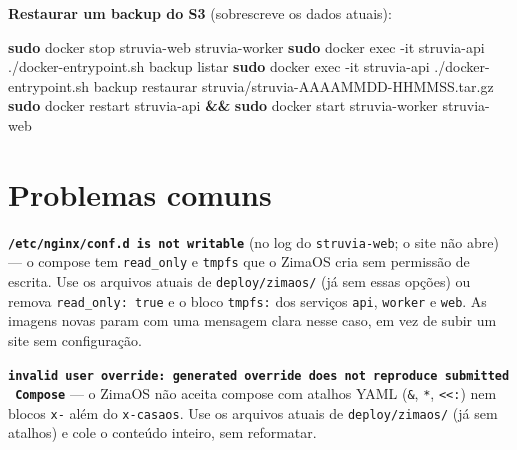 \documentclass[
  10pt,
]{article}
\newenvironment{Shaded}{\begin{snugshade}}{\end{snugshade}}
\newcommand{\AttributeTok}[1]{\textcolor[rgb]{0.13,0.29,0.53}{#1}}
\newcommand{\FunctionTok}[1]{\textcolor[rgb]{0.13,0.29,0.53}{\textbf{#1}}}
\newcommand{\KeywordTok}[1]{\textcolor[rgb]{0.13,0.29,0.53}{\textbf{#1}}}
\newcommand{\NormalTok}[1]{#1}
\newcommand{\OperatorTok}[1]{\textcolor[rgb]{0.81,0.36,0.00}{\textbf{#1}}}
\newcommand{\VariableTok}[1]{\textcolor[rgb]{0.00,0.00,0.00}{#1}}
\begin{document}
\begin{Shaded}
\end{Shaded}

\textbf{Restaurar um backup do S3} (sobrescreve os dados atuais):

\begin{Shaded}
\begin{Highlighting}[]
\FunctionTok{sudo}\NormalTok{ docker stop struvia{-}web struvia{-}worker}
\FunctionTok{sudo}\NormalTok{ docker exec }\AttributeTok{{-}it}\NormalTok{ struvia{-}api ./docker{-}entrypoint.sh backup listar}
\FunctionTok{sudo}\NormalTok{ docker exec }\AttributeTok{{-}it}\NormalTok{ struvia{-}api ./docker{-}entrypoint.sh backup restaurar struvia/struvia{-}AAAAMMDD{-}HHMMSS.tar.gz}
\FunctionTok{sudo}\NormalTok{ docker restart struvia{-}api }\KeywordTok{\&\&} \FunctionTok{sudo}\NormalTok{ docker start struvia{-}worker struvia{-}web}
\end{Highlighting}
\end{Shaded}

\hypertarget{problemas-comuns}{%
\section{Problemas comuns}\label{problemas-comuns}}

\textbf{\texttt{/etc/nginx/conf.d\ is\ not\ writable}} (no log do
\texttt{struvia-web}; o site não abre) --- o compose tem
\texttt{read\_only} e \texttt{tmpfs} que o ZimaOS cria sem permissão de
escrita. Use os arquivos atuais de \texttt{deploy/zimaos/} (já sem essas
opções) ou remova \texttt{read\_only:\ true} e o bloco \texttt{tmpfs:}
dos serviços \texttt{api}, \texttt{worker} e \texttt{web}. As imagens
novas param com uma mensagem clara nesse caso, em vez de subir um site
sem configuração.

\textbf{\texttt{invalid\ user\ override:\ generated\ override\ does\ not\ reproduce\ submitted\ Compose}}
--- o ZimaOS não aceita compose com atalhos YAML (\texttt{\&},
\texttt{*}, \texttt{\textless{}\textless{}:}) nem blocos \texttt{x-}
além do \texttt{x-casaos}. Use os arquivos atuais de
\texttt{deploy/zimaos/} (já sem atalhos) e cole o conteúdo inteiro, sem
reformatar.
\end{document}
